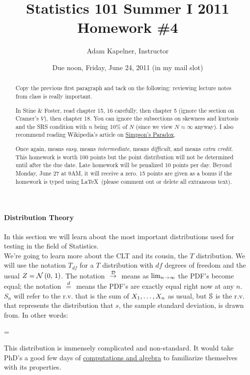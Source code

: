 \documentclass[12pt]{article}
\title{Statistics 101 Summer I 2011 \\ Homework \#4}
\author{Adam Kapelner, Instructor}
\date{Due noon, Friday, June 24, 2011 (in my mail slot)}
\begin{document}
\maketitle


\begin{abstract}
Copy the previous first paragraph and tack on the following: reviewing lecture notes from class is really important.

In Stine \& Foster, read chapter 15, 16 carefully, then chapter 5 (ignore the section on Cramer's $V$), then chapter 18. You can ignore the subsections on skewness and kurtosis and the SRS condition with $n$ being 10\% of $N$ (since we view $N \approx \infty$ anyway). I also recommend reading Wikipedia's article on \href{http://en.wikipedia.org/wiki/Simpson%27s_paradox}{Simpson's Paradox}.

Once again,  means \textit{easy},  means \textit{intermediate},  means \textit{difficult}, and  means \textit{extra credit}. This homework is worth 100 points but the point distribution will not be determined until after the due date. Late homework will be penalized 10 points per day. Beyond Monday, June 27 at 9AM, it will receive a zero. 15 points are given as a bonus if the homework is typed using \LaTeX ~(please comment out or delete all extraneous text).
\end{abstract}

\paragraph{Distribution Theory} In this section we will learn about the most important distributions used for testing in the field of Statistics. \\

\problem We're going to learn more about the CLT and its cousin, the $T$ distribution. We will use the notation $T_{df}$ for a $T$ distribution with $df$ degrees of freedom and the usual $Z = \mathcal{N}\left(0,\,1\right)$. The notation $\convd$ means as $\lim_{n \rightarrow \infty}$ the PDF's become equal; the notation $\equalsindist$ means the PDF's are exactly equal right now \ie at any $n$. $S_n$ will refer to the r.v. that is the sum of $X_1, \ldots, X_n$ as usual, but $\mathbb{S}$ is the r.v. that represents the distribution that $s$, the sample standard deviation, is drawn from. In other words:

\beqn
\sddist = 
\eeqn

This distribution is immensely complicated and non-standard. It would take PhD's a good few days of \href{http://en.wikipedia.org/wiki/User:Rb88guy/sandbox}{computations and algebra} to familiarize themselves with its properties.
\end{document}

